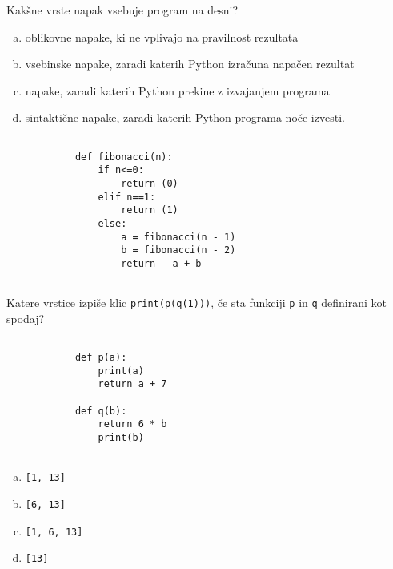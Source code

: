 \documentclass[arhiv, 10pt]{../izpit}
\newcommand{\inlinepy}[1]{\texttt{#1}}
\begin{document}
        \naloga*
        \begin{multicols}{2}
        \noindent
        Kakšne vrste napak vsebuje program na desni?

        \begin{enumerate}[(a)]
\item oblikovne napake, ki ne vplivajo na pravilnost rezultata
\item vsebinske napake, zaradi katerih Python izračuna napačen rezultat
\item napake, zaradi katerih Python prekine z izvajanjem programa
\item sintaktične napake, zaradi katerih Python programa noče izvesti.
\end{enumerate}

        \columnbreak

        \begin{verbatim}
        
            def fibonacci(n):
                if n<=0:
                    return (0)
                elif n==1:
                    return (1)
                else:
                    a = fibonacci(n - 1)
                    b = fibonacci(n - 2)
                    return   a + b
            
        \end{verbatim}

        \end{multicols}

    
        \naloga*
        Katere vrstice izpiše klic \inlinepy{print(p(q(1)))}, če sta funkciji \inlinepy{p} in \inlinepy{q} definirani kot spodaj?

        \begin{multicols}{2}
        \begin{verbatim}
        
            def p(a):
                print(a)
                return a + 7

            def q(b):
                return 6 * b
                print(b)
        
        \end{verbatim}

        \begin{enumerate}[(a)]
\item \inlinepy{[1, 13]}
\item \inlinepy{[6, 13]}
\item \inlinepy{[1, 6, 13]}
\item \inlinepy{[13]}
\end{enumerate}

        \end{multicols}
    
\end{document}
